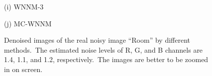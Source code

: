 \documentclass[10pt,onecolumn,letterpaper]{article}
\begin{document}
\begin{figure}[!htbp]
{\begin{minipage}[t]{0.3\textwidth}
{\footnotesize (i) WNNM-3    }
\end{minipage}
\begin{minipage}[t]{0.3\textwidth}
\centering
{}
{\footnotesize (j) MC-WNNM  }
\end{minipage}
}
\vspace{-1mm}
\caption{Denoised images of the real noisy image ``Room'' \cite{ncwebsite} by different methods.\ The estimated noise levels of R, G, and B channels are 1.4, 1.1, and 1.2, respectively.\ The images are better to be zoomed in on screen.}
\label{f10}
\end{figure}
\end{document}
